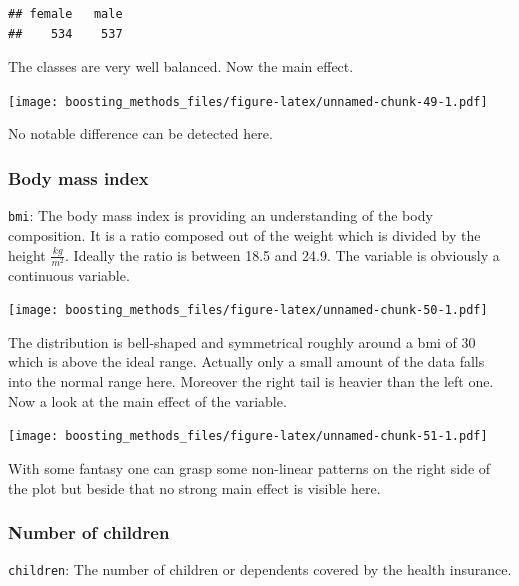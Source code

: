 \documentclass[
]{book}
\newenvironment{Shaded}{\begin{snugshade}}{\end{snugshade}}
\newcommand{\FunctionTok}[1]{\textcolor[rgb]{0.00,0.00,0.00}{#1}}
\newcommand{\NormalTok}[1]{#1}
\newcommand{\SpecialCharTok}[1]{\textcolor[rgb]{0.00,0.00,0.00}{#1}}
\begin{document}
\begin{Shaded}
\end{Shaded}

\begin{verbatim}
## female   male 
##    534    537
\end{verbatim}

The classes are very well balanced. Now the main effect.

\texttt{[image: boosting\_methods\_files/figure-latex/unnamed-chunk-49-1.pdf]}

No notable difference can be detected here.

\hypertarget{body-mass-index}{%
\subsubsection{Body mass index}\label{body-mass-index}}

\texttt{bmi}: The body mass index is providing an understanding of the body composition. It is a ratio composed out of the weight which is divided by the height \(\frac{kg}{m^2}\). Ideally the ratio is between 18.5 and 24.9. The variable is obviously a continuous variable.

\texttt{[image: boosting\_methods\_files/figure-latex/unnamed-chunk-50-1.pdf]}

The distribution is bell-shaped and symmetrical roughly around a bmi of 30 which is above the ideal range. Actually only a small amount of the data falls into the normal range here. Moreover the right tail is heavier than the left one. Now a look at the main effect of the variable.

\texttt{[image: boosting\_methods\_files/figure-latex/unnamed-chunk-51-1.pdf]}

With some fantasy one can grasp some non-linear patterns on the right side of the plot but beside that no strong main effect is visible here.

\hypertarget{number-of-children}{%
\subsubsection{Number of children}\label{number-of-children}}

\texttt{children}: The number of children or dependents covered by the health insurance.
\end{document}
